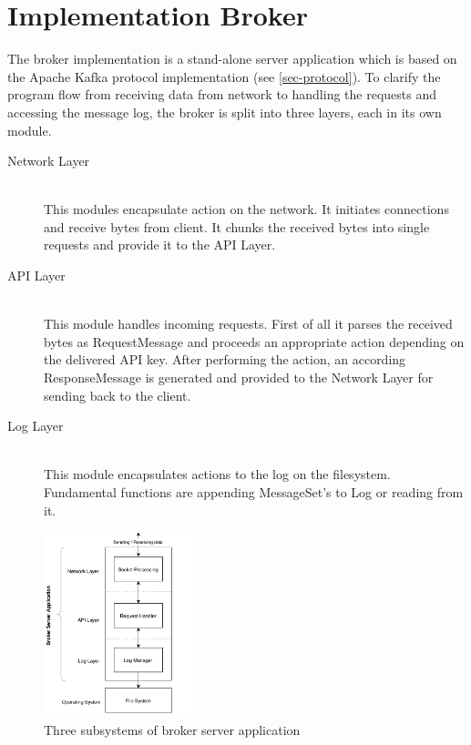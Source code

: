 \chapter{Implementation Broker}
\label{chap:broker}
The broker implementation is a stand-alone server application which is based on the
Apache Kafka protocol implementation (see \ref{sec-protocol}). To clarify the
program flow from receiving data from network to handling the requests and
accessing the message log, the broker is split into three
layers, each in its own module. 

\begin{description}
    \item [Network Layer] \hfill \\
        This modules encapsulate action on the network. It initiates
        connections and receive bytes from client. It chunks the received bytes
        into single requests and provide it to the API Layer. 
    \item [API Layer] \hfill \\
        This module handles incoming requests. First of all it parses the
        received bytes as RequestMessage and proceeds an appropriate action
        depending on the delivered API key. After performing the action, an
        according ResponseMessage is generated and provided to the Network Layer
        for sending back to the client. 
    \item [Log Layer] \hfill \\
        This module encapsulates actions to the log on the filesystem.
        Fundamental functions are appending MessageSet's to Log or reading from
        it. 
\end{description}

\begin{figure}[H]
    \centering
    \includegraphics[width=0.4\textwidth]{images/impl-brok-layers.png}
    \caption{Three subsystems of broker server application}
    \label{fig:impl-brok-layers}
\end{figure}




